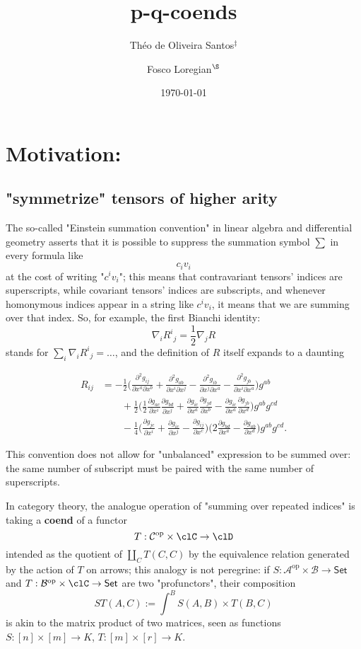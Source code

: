\documentclass[11pt]{amsart}
\author{Théo de Oliveira Santos$^\ddag$}
\author{Fosco Loregian$^\S$}
\date{\today}
\title{p-q-coends}
\begin{document}
\maketitle
\tableofcontents


\section{Motivation:}
\label{sec:org59907ba}
\subsection{"symmetrize" tensors of higher arity}
\label{sec:orgb9ea8dc}

The so-called "Einstein summation convention" in linear algebra and differential geometry 
asserts that it is possible to suppress the summation symbol \(\sum\) in every formula like 
\[
 c_i v_i
\] at the cost of writing "\(c^iv_i\)"; this means that contravariant tensors' indices are superscripts,
while covariant tensors' indices are subscripts, and whenever homonymous indices appear in a string 
like \(c^iv_i\), it means that we are summing over that index. So, for example, the first
Bianchi identity:
\[
\nabla_i {R^i}_j = \frac{1}{2}\nabla_j R
\] stands for \(\sum_i \nabla_i {R^i}_j = \dots\), and the definition of \(R\) itself expands to a daunting

\begin{align*}
R_{ij}&=-\frac{1}{2}\Big(\frac{\partial^2g_{ij}}{\partial x^a\partial x^b}+\frac{\partial^2g_{ab}}{\partial x^i\partial x^j}-\frac{\partial^2g_{ib}}{\partial x^j\partial x^a}-\frac{\partial^2g_{jb}}{\partial x^i\partial x^a}\Big)g^{ab}\\
&\qquad+\frac{1}{2}\Big(\frac{1}{2}\frac{\partial g_{ac}}{\partial x^i}\frac{\partial g_{bd}}{\partial x^j}+\frac{\partial g_{ic}}{\partial x^a}\frac{\partial g_{jd}}{\partial x^b}-\frac{\partial g_{ic}}{\partial x^a}\frac{\partial g_{jb}}{\partial x^d}\Big)g^{ab}g^{cd}\\
&\qquad-\frac{1}{4}\Big(\frac{\partial g_{jc}}{\partial x^i}+\frac{\partial g_{ic}}{\partial x^j}-\frac{\partial g_{ij}}{\partial x^c}\Big)\Big(2\frac{\partial g_{bd}}{\partial x^a}-\frac{\partial g_{ab}}{\partial x^d}\Big)g^{ab}g^{cd}.
\end{align*}  

This convention does not allow for "unbalanced" expression to be summed over: the
same number of subscript must be paired with the same number of superscripts.

In category theory, the analogue operation of "summing over repeated indices" is taking a \textbf{coend} of a functor 
\[
T : \mathcal{C}^\text{op} \times \clC \to \clD
\] intended as the quotient  of \(\coprod_C T(C,C)\) by the equivalence relation generated by the action of \(T\) on arrows; this analogy is not peregrine: if \(S : \mathcal{A}^\text{op} \times \mathcal{B} \to \textsf{Set}\) and \(T : \mathcal{B}^\text{op} \times \clC \to \textsf{Set}\) are two "profunctors", their composition 
\[
ST(A,C) :=  \int^B S(A,B)\times T(B,C)
\] is akin to the matrix product of two matrices, seen as functions \(S : [n]\times [m] \to K\), \(T : [m]\times [r] \to K\).
\end{document}
